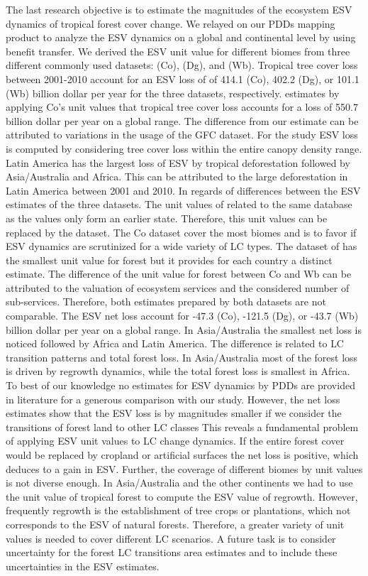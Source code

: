 		The last research objective is to estimate the magnitudes of the ecosystem \ac{ESV} dynamics of tropical forest cover change. We relayed on our \acp{PDD} mapping product to analyze the \ac{ESV} dynamics on a global and continental level by using benefit transfer. We derived the \ac{ESV} unit value for different biomes from three different commonly used datasets: \citet{Costanza2014} (Co), \citet{Groot2012} (Dg), and \citet{Siikamaki2015} (Wb). Tropical tree cover loss between 2001-2010 account for an \ac{ESV} loss of of 414.1 (Co), 402.2 (Dg), or 101.1 (Wb) billion dollar per year for the three datasets, respectively. \citet{Song2018} estimates by applying Co's unit values that tropical tree cover loss accounts for a loss of 550.7 billion dollar per year on a global range. The difference from our estimate can be attributed to variations in the usage of the \ac{GFC} dataset. For the study \ac{ESV} loss is computed by considering tree cover loss within the entire canopy density range. Latin America has the largest loss of \ac{ESV} by tropical deforestation followed by Asia/Australia and Africa. This can be attributed to the large deforestation in Latin America between 2001 and 2010. In regards of differences between the \ac{ESV} estimates of the three datasets. The unit values of \citet{Groot2012} related to the same database as the \citet{Costanza2014} values only form an earlier state. Therefore, this unit values can be replaced by the \citet{Costanza2014} dataset. The Co dataset cover the most biomes and is to favor if \ac{ESV} dynamics are scrutinized for a wide variety of \ac{LC} types. The dataset of \citet{Siikamaki2015} has the smallest unit value for forest but it provides for each country a distinct estimate. The difference of the unit value for forest between Co and Wb can be attributed to the valuation of ecosystem services and the considered number of sub-services. Therefore, both estimates prepared by both datasets are not comparable. The \ac{ESV} net loss account for -47.3 (Co), -121.5 (Dg), or -43.7 (Wb) billion dollar per year on a global range. In Asia/Australia the smallest net loss is noticed followed by Africa and Latin America. The difference is related to \ac{LC} transition patterns and total forest loss. In Asia/Australia most of the forest loss is driven by regrowth dynamics, while the total forest loss is smallest in Africa. To best of our knowledge no estimates for \ac{ESV} dynamics by \acp{PDD} are provided in literature for a generous comparison with our study. However, the net loss estimates show that the \ac{ESV} loss is by magnitudes smaller if we consider the transitions of forest land to other \ac{LC} classes This reveals a fundamental problem of applying \ac{ESV} unit values to \ac{LC} change dynamics. If the entire forest cover would be replaced by cropland or artificial surfaces the net loss is positive, which deduces to a gain in \ac{ESV}. Further, the coverage of different biomes by unit values is not diverse enough. In Asia/Australia and the other continents we had to use the unit value of tropical forest to compute the \ac{ESV} value of regrowth. However, frequently regrowth is the establishment of tree crops or plantations, which not corresponds to the \ac{ESV} of natural forests. Therefore, a greater variety of unit values is needed to cover different \ac{LC} scenarios. A future task is to consider uncertainty for the forest \ac{LC} transitions area estimates and to include these uncertainties in the \ac{ESV} estimates. 